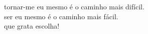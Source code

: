 tornar-me eu mesmo é o caminho mais difícil.\\
ser eu mesmo é o caminho mais fácil.\\
que grata escolha!